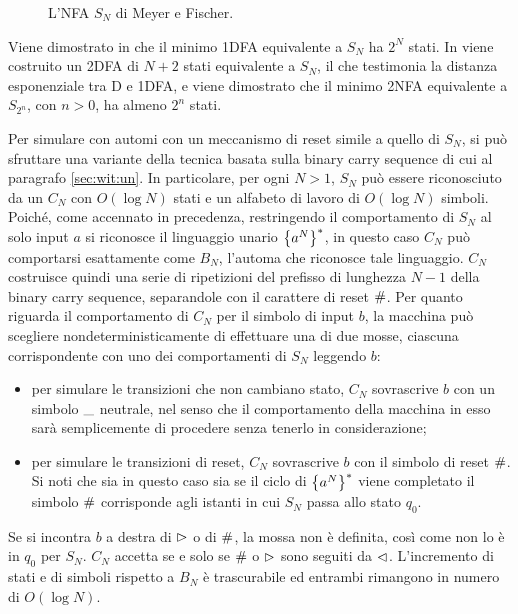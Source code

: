 \begin{figure}
	\centering
	
	\caption{L'NFA $S_N$ di Meyer e Fischer.}
	\label{img:wit:Sn}
\end{figure}

Viene dimostrato in \cite{Meyer:71:ecodescription} che il minimo 1DFA equivalente a $S_N$ ha $2^N$ stati. In \cite{Pighizzini:22:limitedwitness} viene costruito un 2DFA di $N+2$ stati equivalente a $S_N$, il che testimonia la distanza esponenziale tra D e 1DFA, e viene dimostrato che il minimo 2NFA equivalente a $S_{2^n}$, con $n>0$, ha almeno $2^n$ stati.

Per simulare con  automi con un meccanismo di reset simile a quello di $S_N$, si può sfruttare una variante della tecnica basata sulla binary carry sequence di cui al paragrafo \ref{sec:wit:un}. In particolare, per ogni $N>1$, $S_N$ può essere riconosciuto da un  $C_N$ con $O(\log N)$ stati e un alfabeto di lavoro di $O(\log N)$ simboli.
Poiché, come accennato in precedenza, restringendo il comportamento di $S_N$ al solo input $a$ si riconosce il linguaggio unario $\left\{ a^N \right\}^*$, in questo caso $C_N$ può comportarsi esattamente come $B_N$, l'automa che riconosce tale linguaggio. $C_N$ costruisce quindi una serie di ripetizioni del prefisso di lunghezza $N-1$ della binary carry sequence, separandole con il carattere di reset $\#$. Per quanto riguarda il comportamento di $C_N$ per il simbolo di input $b$, la macchina può scegliere nondeterministicamente di effettuare una di due mosse, ciascuna corrispondente con uno dei comportamenti di $S_N$ leggendo $b$:
\begin{itemize}
	\item per simulare le transizioni che non cambiano stato, $C_N$ sovrascrive $b$ con un simbolo $\_$ neutrale, nel senso che il comportamento della macchina in esso sarà semplicemente di procedere senza tenerlo in considerazione;
	\item per simulare le transizioni di reset, $C_N$ sovrascrive $b$ con il simbolo di reset $\#$. Si noti che sia in questo caso sia se il ciclo di $\left\{ a^N \right\}^*$ viene completato il simbolo $\#$ corrisponde agli istanti in cui $S_N$ passa allo stato $q_0$.
\end{itemize}
Se si incontra $b$ a destra di $\rhd$ o di $\#$, la mossa non è definita, così come non lo è in $q_0$ per $S_N$. $C_N$ accetta se e solo se $\#$ o $\rhd$ sono seguiti da $\lhd$. L'incremento di stati e di simboli rispetto a $B_N$ è trascurabile ed entrambi rimangono in numero di $O(\log N)$.

